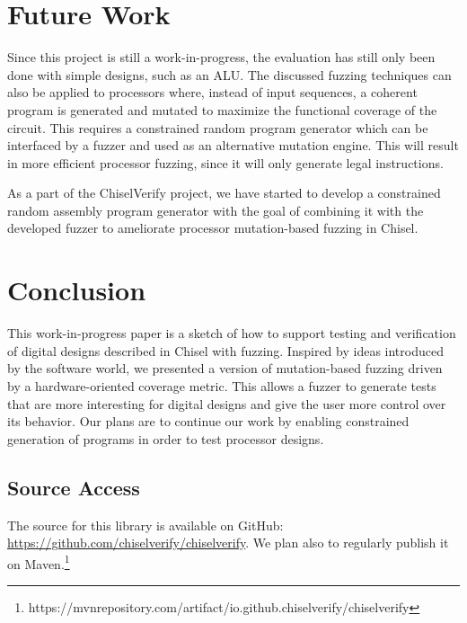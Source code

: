 \documentclass[conference]{IEEEtran}
\newcommand{\todo}[1]{{\color{olive} TODO: #1}}
\begin{document}
\section{Future Work}
Since this project is still a work-in-progress, the evaluation has still only been done with simple designs, such as an ALU.
The discussed fuzzing techniques can also be applied to processors where, instead of input sequences, a coherent program is generated and mutated to maximize the functional coverage of the circuit. 
This requires a constrained random program generator which can be interfaced by a fuzzer and used as an alternative mutation engine.
This will result in more efficient processor fuzzing, since it will only generate legal instructions. 

As a part of the ChiselVerify project, we have started to develop a constrained random assembly program generator with the goal of combining it with the developed fuzzer to ameliorate processor mutation-based fuzzing in Chisel.

\section{Conclusion}
\label{sec:conclusion}

This work-in-progress paper is a sketch of how to support testing and verification
of digital designs described in Chisel with fuzzing. 
Inspired by ideas introduced by the software world, we presented a version of mutation-based fuzzing driven by a hardware-oriented coverage metric.
This allows a fuzzer to generate tests that are more interesting for digital designs and give the user more control over its behavior. 
Our plans are to continue our work by enabling constrained generation of programs in order to test processor designs.

\subsection*{Source Access}

The source for this library is available on GitHub:\\ \url{https://github.com/chiselverify/chiselverify}.
We plan also to regularly publish it on Maven.\footnote{https://mvnrepository.com/artifact/io.github.chiselverify/chiselverify}



\end{document}
